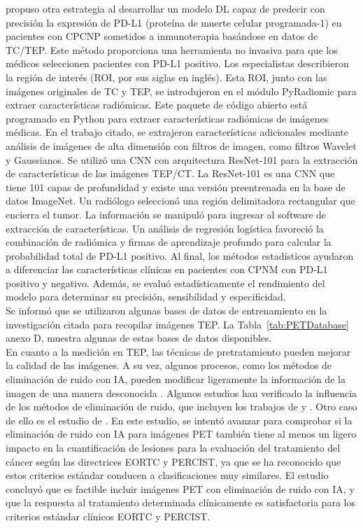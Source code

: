 \documentclass[11pt,a4paper,openany]{article}
\begin{document}
        \cite{Li2024} propuso otra estrategia al desarrollar un modelo DL capaz de predecir con precisión la expresión de PD-L1 (proteína de muerte celular programada-1) en pacientes con CPCNP sometidos a inmunoterapia basándose en datos de TC/TEP. Este método proporciona una herramienta no invasiva para que los médicos seleccionen pacientes con PD-L1 positivo. Los especialistas describieron la región de interés (ROI, por sus siglas en inglés). Esta ROI, junto con las imágenes originales de TC y TEP, se introdujeron en el módulo PyRadiomic para extraer características radiómicas. Este paquete de código abierto está programado en Python para extraer características radiómicas de imágenes médicas. En el trabajo citado, se extrajeron características adicionales mediante análisis de imágenes de alta dimensión con filtros de imagen, como filtros Wavelet y Gaussianos. Se utilizó una CNN con arquitectura ResNet-101 para la extracción de características de las imágenes TEP/CT. La ResNet-101 es una CNN que tiene 101 capas de profundidad y existe una versión preentrenada en la base de datos ImageNet. Un radiólogo seleccionó una región delimitadora rectangular que encierra el tumor. La información se manipuló para ingresar al software de extracción de características. Un análisis de regresión logística favoreció la combinación de radiómica y firmas de aprendizaje profundo para calcular la probabilidad total de PD-L1 positivo. Al final, los métodos estadísticos ayudaron a diferenciar las características clínicas en pacientes con CPNM con PD-L1 positivo y negativo. Además, se evaluó estadísticamente el rendimiento del modelo para determinar su precisión, sensibilidad y especificidad.\\

        Se informó que se utilizaron algunas bases de datos de entrenamiento en la investigación citada para recopilar imágenes TEP. La Tabla~\ref{tab:PETDatabase} anexo D, muestra algunas de estas bases de datos disponibles.\\

        En cuanto a la medición en TEP, las técnicas de pretratamiento pueden mejorar la calidad de las imágenes. A su vez, algunos procesos, como los métodos de eliminación de ruido con IA, pueden modificar ligeramente la información de la imagen de una manera desconocida \cite{Jaudet2021}. Algunos estudios han verificado la influencia de los métodos de eliminación de ruido, que incluyen los trabajos de \cite{weyts_2022} y \cite{Jaudet2021}. Otro caso de ello es el estudio de \cite{Weyts2024}. En este estudio, se intentó avanzar para comprobar si la eliminación de ruido con IA para imágenes PET también tiene al menos un ligero impacto en la cuantificación de lesiones para la evaluación del tratamiento del cáncer según las directrices EORTC y PERCIST, ya que se ha reconocido que estos criterios estándar conducen a clasificaciones muy similares. El estudio concluyó que es factible incluir imágenes PET con eliminación de ruido con IA, y que la respuesta al tratamiento determinada clínicamente es satisfactoria para los criterios estándar clínicos EORTC y PERCIST.
\end{document}
